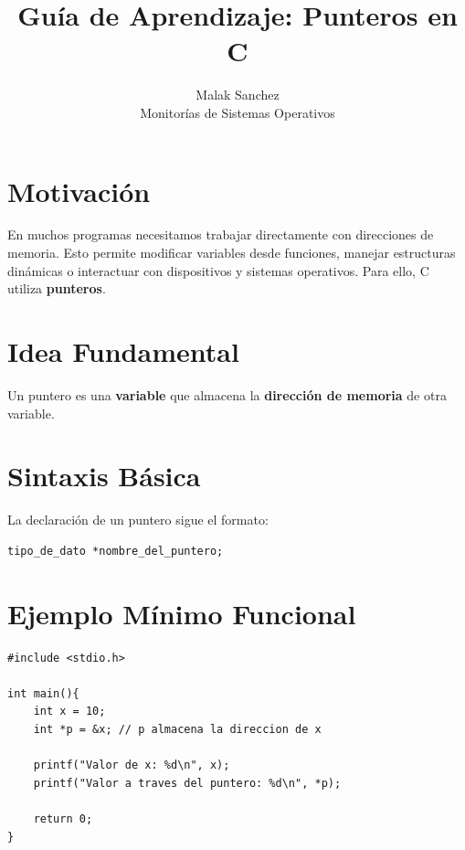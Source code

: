 \documentclass[12pt,a4paper]{article}
\title{\textbf{Guía de Aprendizaje: Punteros en C}}
\author{Malak Sanchez \\ \small Monitorías de Sistemas Operativos}
\date{}
\begin{document}
\maketitle

\section{Motivación}
En muchos programas necesitamos trabajar directamente con direcciones de memoria. Esto permite modificar variables desde funciones, manejar estructuras dinámicas o interactuar con dispositivos y sistemas operativos. Para ello, C utiliza \textbf{punteros}.

\section{Idea Fundamental}
Un puntero es una \textbf{variable} que almacena la \textbf{dirección de memoria} de otra variable.

\begin{center}
\end{center}

\section{Sintaxis Básica}
La declaración de un puntero sigue el formato:
\begin{lstlisting}[numbers=none]
tipo_de_dato *nombre_del_puntero;
\end{lstlisting}

\section{Ejemplo Mínimo Funcional}
\begin{lstlisting}
#include <stdio.h>

int main(){
    int x = 10;
    int *p = &x; // p almacena la direccion de x

    printf("Valor de x: %d\n", x);
    printf("Valor a traves del puntero: %d\n", *p);

    return 0;
}
\end{lstlisting}
\end{document}
